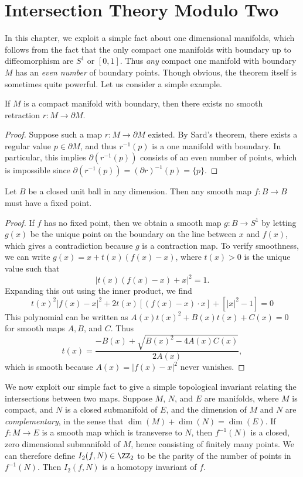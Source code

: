 \section{Intersection Theory Modulo Two}

In this chapter, we exploit a simple fact about one dimensional manifolds, which follows from the fact that the only compact one manifolds with boundary up to diffeomorphism are $S^1$ or $[0,1]$. Thus \emph{any} compact one manifold with boundary $M$ has an \emph{even number} of boundary points. Though obvious, the theorem itself is sometimes quite powerful. Let us consider a simple example.

\begin{theorem}
    If $M$ is a compact manifold with boundary, then there exists no smooth retraction $r: M \to \partial M$.
\end{theorem}
\begin{proof}
    Suppose such a map $r: M \to \partial M$ existed. By Sard's theorem, there exists a regular value $p \in \partial M$, and thus $r^{-1}(p)$ is a one manifold with boundary. In particular, this implies $\partial (r^{-1}(p))$ consists of an even number of points, which is impossible since $\partial (r^{-1}(p)) = (\partial r)^{-1}(p) = \{ p \}$.
\end{proof}

\begin{corollary}[Brouwer]
    Let $B$ be a closed unit ball in any dimension. Then any smooth map $f: B \to B$ must have a fixed point.
\end{corollary}
\begin{proof}
    If $f$ has no fixed point, then we obtain a smooth map $g: B \to S^1$ by letting $g(x)$ be the unique point on the boundary on the line between $x$ and $f(x)$, which gives a contradiction because $g$ is a contraction map. To verify smoothness, we can write $g(x) = x + t(x)(f(x) - x)$, where $t(x) > 0$ is the unique value such that
    \[ |t(x)(f(x) - x) + x|^2 = 1. \]
    Expanding this out using the inner product, we find
    \[ t(x)^2 |f(x) - x|^2 + 2t(x)[(f(x) - x) \cdot x] + [|x|^2 - 1] = 0 \]
    This polynomial can be written as $A(x) t(x)^2 + B(x) t(x) + C(x) = 0$ for smooth maps $A,B$, and $C$. Thus
    \[ t(x) = \frac{-B(x) + \sqrt{B(x)^2 - 4A(x)C(x)}}{2A(x)}, \]
    which is smooth because $A(x) = |f(x) - x|^2$ never vanishes.
\end{proof}

We now exploit our simple fact to give a simple topological invariant relating the intersections between two maps. Suppose $M$, $N$, and $E$ are manifolds, where $M$ is compact, and $N$ is a closed submanifold of $E$, and the dimension of $M$ and $N$ are \emph{complementary}, in the sense that $\dim(M) + \dim(N) = \dim(E)$. If $f: M \to E$ is a smooth map which is transverse to $N$, then $f^{-1}(N)$ is a closed, zero dimensional submanifold of $M$, hence consisting of finitely many points. We can therefore define $I_2(f,N) \in \ZZ_2$ to be the parity of the number of points in $f^{-1}(N)$. Then $I_2(f,N)$ is a homotopy invariant of $f$.

